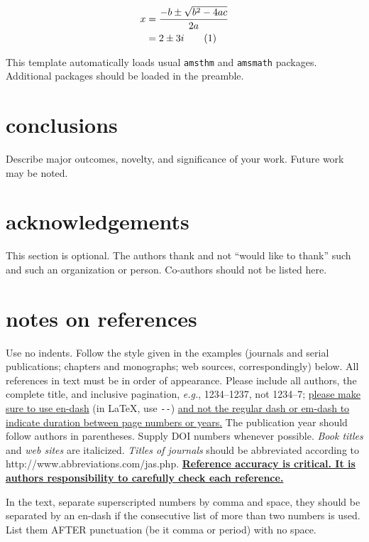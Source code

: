 \documentclass[10pt]{article}
\newcommand\num{\addtocounter{equation}{1}\tag{\theequation}}
\renewcommand{\theequation}{\arabic{equation}}
\begin{document}
\begin{align*}
x &= \dfrac{-b \pm \sqrt{b^2 - 4ac}}{2a} \\
  &= 2 \pm 3i \num \label{eqn2}
\end{align*}

This template automatically loads usual \verb+amsthm+ and \verb+amsmath+ packages.  Additional packages should be loaded in the preamble.

\section*{conclusions}
Describe major outcomes, novelty, and significance of your work. Future work may be noted.

\section*{acknowledgements}
This section is optional. The authors thank and not ``would like to thank'' such and such an organization or person. Co-authors should not be listed here.

\section*{notes on references}

Use no indents. Follow the style given in the examples (journals and serial publications;\cite{journal} chapters and monographs;\cite{chapters} web sources,\cite{web} correspondingly) below. All references in text must be in order of appearance. Please include all authors, the complete title, and inclusive pagination, \textit{e.g.}, 1234--1237, not 1234--7; \ul{please make sure to use en-dash} (in \LaTeX, use \verb+--+) \ul{and not the regular dash or em-dash to indicate duration between page numbers or years.} The publication year should follow authors in parentheses. Supply DOI numbers whenever possible. \textit{Book titles} and \textit{web sites} are italicized. \textit{Titles of journals} should be abbreviated according to http://www.abbreviations.com/jas.php. \textbf{\ul{Reference accuracy is critical. It is authors responsibility to carefully check each reference.}}

In the text, separate superscripted numbers by comma and space,\cite{journal,chapters} they should be separated by an en-dash if the consecutive list of more than two numbers is used.\cite{journal,chapters,web} List them AFTER punctuation (be it comma or period) with no space.
\end{document}
